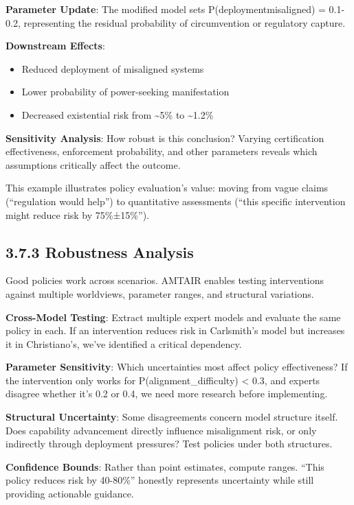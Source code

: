 \documentclass[
  11pt,
  letterpaper,
  openany]{book}
\providecommand{\tightlist}{%
  \setlength{\itemsep}{0pt}\setlength{\parskip}{0pt}}
\begin{document}
\textbf{Parameter Update}: The modified model sets
P(deployment\textbar misaligned) = 0.1-0.2, representing the residual
probability of circumvention or regulatory capture.

\textbf{Downstream Effects}:

\begin{itemize}
\tightlist
\item
  Reduced deployment of misaligned systems
\item
  Lower probability of power-seeking manifestation
\item
  Decreased existential risk from \textasciitilde5\% to
  \textasciitilde1.2\%
\end{itemize}

\textbf{Sensitivity Analysis}: How robust is this conclusion? Varying
certification effectiveness, enforcement probability, and other
parameters reveals which assumptions critically affect the outcome.

This example illustrates policy evaluation's value: moving from vague
claims (``regulation would help'') to quantitative assessments (``this
specific intervention might reduce risk by 75\%±15\%'').

\subsection{3.7.3 Robustness Analysis}\label{sec-robustness}

Good policies work across scenarios. AMTAIR enables testing
interventions against multiple worldviews, parameter ranges, and
structural variations.

\textbf{Cross-Model Testing}: Extract multiple expert models and
evaluate the same policy in each. If an intervention reduces risk in
Carlsmith's model but increases it in Christiano's, we've identified a
critical dependency.

\textbf{Parameter Sensitivity}: Which uncertainties most affect policy
effectiveness? If the intervention only works for
P(alignment\_difficulty) \textless{} 0.3, and experts disagree whether
it's 0.2 or 0.4, we need more research before implementing.

\textbf{Structural Uncertainty}: Some disagreements concern model
structure itself. Does capability advancement directly influence
misalignment risk, or only indirectly through deployment pressures? Test
policies under both structures.

\textbf{Confidence Bounds}: Rather than point estimates, compute ranges.
``This policy reduces risk by 40-80\%'' honestly represents uncertainty
while still providing actionable guidance.
\end{document}
